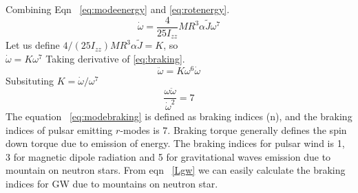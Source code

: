 \documentclass{ttuthes2007}
\begin{document}
Combining Eqn ~\ref{eq:modeenergy} and \ref{eq:rotenergy}.
\begin{equation}\label{eq:braking}
\dot{\omega}=\frac{4}{25 I_{zz}}M R^3 \alpha\tilde{J} \omega^7 
\end{equation}
Let us define $4/(25 I_{zz})M R^3 \alpha\tilde{J}=K$, so\\
$\dot{\omega}=K \omega^7$
Taking derivative of \ref{eq:braking}.
\begin{equation}
\ddot{\omega}= K\omega^6\dot{\omega}
\end{equation}
Subsituting $K=\dot{\omega}/\omega^7$
\begin{equation}\label{eq:modebraking}
\frac{\omega\ddot{\omega}}{\dot{\omega}^2}=7
\end{equation}
The equation ~\ref{eq:modebraking} is defined as braking indices (n), and the
braking indices of pulsar emitting $r$-modes is 7. Braking torque generally
defines the spin down torque due to emission of energy. The braking indices for
pulsar wind is 1, 3 for magnetic dipole radiation and 5 for gravitational waves 
emission due to mountain on neutron stars. From eqn ~\ref{Lgw} we can easily
calculate the braking indices for \ac{GW} due to mountains on neutron star.
\end{document}
